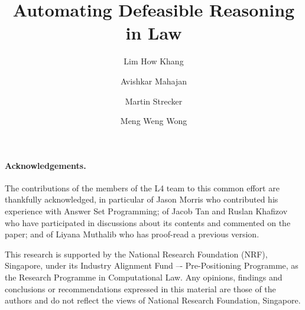 \documentclass[runningheads]{llncs}
\begin{document}


\title{Automating Defeasible Reasoning in Law}

\author{
Lim How Khang \and
Avishkar Mahajan \and
Martin Strecker \and
Meng Weng Wong
}


\maketitle

\begin{abstract}

\end{abstract}






% 



%





\paragraph{Acknowledgements.}
The contributions of the members of the L4 team to this common effort are
thankfully acknowledged, in particular of Jason Morris who contributed his
experience with Answer Set Programming; of Jacob Tan and Ruslan Khafizov who
have participated in discussions about its contents and commented on the
paper; and of Liyana Muthalib who has proof-read a previous version.

This research is supported by the National Research Foundation (NRF),
Singapore, under its Industry Alignment Fund –- Pre-Positioning Programme, as
the Research Programme in Computational Law. Any opinions, findings and
conclusions or recommendations expressed in this material are those of the
authors and do not reflect the views of National Research Foundation,
Singapore.


% 



\newpage
\appendix




\end{document}
